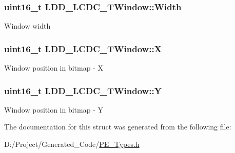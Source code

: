\subsubsection[{Width}]{\setlength{\rightskip}{0pt plus 5cm}uint16\+\_\+t L\+D\+D\+\_\+\+L\+C\+D\+C\+\_\+\+T\+Window\+::\+Width}\label{struct_l_d_d___l_c_d_c___t_window_a53ee53813f5884a400be8ca3093233c4}
Window width \hypertarget{struct_l_d_d___l_c_d_c___t_window_a9dd1270e9794b4dbd79b2b30afca87c9}{}
\subsubsection[{X}]{\setlength{\rightskip}{0pt plus 5cm}uint16\+\_\+t L\+D\+D\+\_\+\+L\+C\+D\+C\+\_\+\+T\+Window\+::\+X}\label{struct_l_d_d___l_c_d_c___t_window_a9dd1270e9794b4dbd79b2b30afca87c9}
Window position in bitmap -\/ X \hypertarget{struct_l_d_d___l_c_d_c___t_window_af64f532d1fb5899c563ba40df90867d8}{}
\subsubsection[{Y}]{\setlength{\rightskip}{0pt plus 5cm}uint16\+\_\+t L\+D\+D\+\_\+\+L\+C\+D\+C\+\_\+\+T\+Window\+::\+Y}\label{struct_l_d_d___l_c_d_c___t_window_af64f532d1fb5899c563ba40df90867d8}
Window position in bitmap -\/ Y 

The documentation for this struct was generated from the following file\+:\begin{DoxyCompactItemize}
\item 
D\+:/\+Project/\+Generated\+\_\+\+Code/\hyperlink{_p_e___types_8h}{P\+E\+\_\+\+Types.\+h}\end{DoxyCompactItemize}
